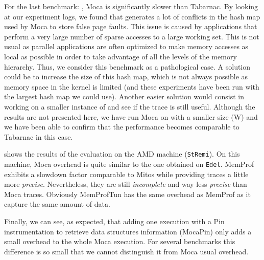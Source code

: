 For the last benchmark: \MG, \gls{Moca} is significantly slower than \gls{Tabarnac}.
By looking at our
experiment logs, we found that \MG generates a lot of conflicts in the hash map used by
\gls{Moca} to store false page faults. This issue is caused by applications that perform a very large number of sparse accesses to a large working set.
This is not usual as parallel applications are often optimized to make memory accesses as local as possible in order to take advantage of all the levels of the
memory hierarchy.
Thus, we consider this benchmark as a pathological case.
A solution could be to increase the size of
this hash map, which is not always possible as memory space in the kernel is
limited (and these experiments have been run with the largest hash map we could use). Another easier solution would consist in working on a smaller instance
of \MG and see if the trace is still useful. Although the results are not presented here, we have run \gls{Moca} on \MG with a smaller size (W) and we have been able
to confirm that the performance becomes comparable to \gls{Tabarnac} in this case.

 shows the results of the evaluation on the AMD machine
(\texttt{StRemi}). On this machine, \gls{Moca} overhead is quite similar to the one
obtained on \texttt{Edel}.
\gls{MemProf} exhibits a slowdown factor comparable to \gls{Mitos} while
providing traces a little more \emph{precise}. Nevertheless, they are still \emph{incomplete} and
way less \emph{precise} than \gls{Moca} traces. Obviously MemProfTun has the same
overhead as \gls{MemProf} as it capture the same amount of data.

Finally, we can see, as expected, that adding one execution with a Pin
instrumentation to retrieve data structures information (\gls{Moca}Pin) only adds a small overhead
to the whole \gls{Moca} execution. For several benchmarks this difference is so small that we cannot
distinguish it from \gls{Moca} usual overhead.

